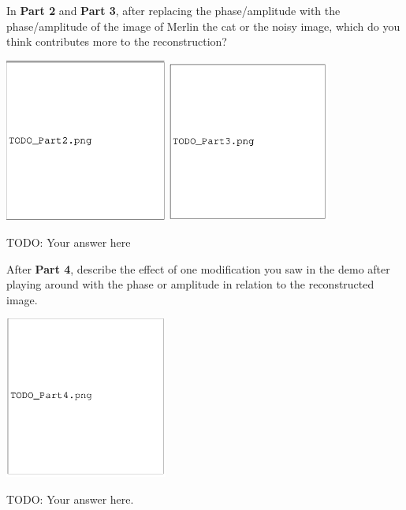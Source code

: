 \documentclass{csci1430}
\begin{document}
\newpage

\begin{subquestion}[points=2]
In \textbf{Part 2} and \textbf{Part 3}, after replacing the phase/amplitude with the phase/amplitude of the image of Merlin the cat or the noisy image, which do you think contributes more to the reconstruction?
\end{subquestion}

\begin{answer}[height=16]
\includegraphics[width=0.4\textwidth,keepaspectratio]{images/TODO_Part2.png}
\includegraphics[width=0.4\textwidth,keepaspectratio]{images/TODO_Part3.png}
        
TODO: Your answer here
\end{answer}

\begin{subquestion}[points=2]
After \textbf{Part 4}, describe the effect of one modification you saw in the demo after playing around with the phase or amplitude in relation to the reconstructed image.
\end{subquestion}

\begin{answer}[height=16]
\includegraphics[width=0.4\textwidth,keepaspectratio]{images/TODO_Part4.png}
    
TODO: Your answer here.
\end{answer}
\end{document}
